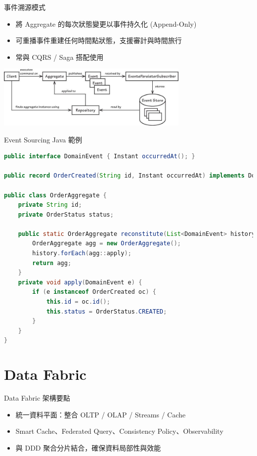 \documentclass[UTF8]{beamer}
\begin{document}
\begin{frame}{事件溯源模式}
  \begin{itemize}
    \item 將 Aggregate 的每次狀態變更以事件持久化 (Append-Only)
    \item 可重播事件重建任何時間點狀態，支援審計與時間旅行
    \item 常與 CQRS / Saga 搭配使用
  \end{itemize}
  \begin{center}
    \includegraphics[width=0.7\textwidth]{img/event-sourcing-pipeline.png}
  \end{center}
\end{frame}

\begin{frame}[fragile]{Event Sourcing Java 範例}
\begin{lstlisting}[language=Java]
public interface DomainEvent { Instant occurredAt(); }

public record OrderCreated(String id, Instant occurredAt) implements DomainEvent {}

public class OrderAggregate {
    private String id;
    private OrderStatus status;

    public static OrderAggregate reconstitute(List<DomainEvent> history) {
        OrderAggregate agg = new OrderAggregate();
        history.forEach(agg::apply);
        return agg;
    }
    private void apply(DomainEvent e) {
        if (e instanceof OrderCreated oc) {
            this.id = oc.id();
            this.status = OrderStatus.CREATED;
        }
    }
}
\end{lstlisting}
\end{frame}

\section{Data Fabric}
\begin{frame}{Data Fabric 架構要點}
    \begin{itemize}
        \item 統一資料平面：整合 OLTP / OLAP / Streams / Cache
        \item Smart Cache、Federated Query、Consistency Policy、Observability
        \item 與 DDD 聚合分片結合，確保資料局部性與效能
    \end{itemize}
\end{frame}
\end{document}
